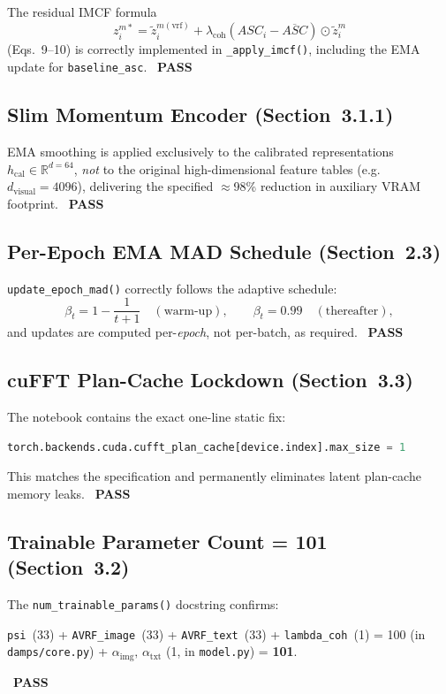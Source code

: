 \documentclass[12pt,a4paper]{article}
\newcommand{\PASS}{\textcolor{passgreen}{\ding{51}~\textbf{PASS}}}
\begin{document}
The residual IMCF formula
\[
  z_i^{m*} = \tilde{z}_i^{m(\mathrm{vrf})}
             + \lambda_{\mathrm{coh}}\!\left(ASC_i - \overline{ASC}\right)
               \odot \tilde{z}_i^m
\]
(Eqs.~9--10) is correctly implemented in \texttt{\_apply\_imcf()}, including
the EMA update for \texttt{baseline\_asc}.  \PASS

\subsection{Slim Momentum Encoder (Section~3.1.1)}

EMA smoothing is applied exclusively to the calibrated representations
$h_{\mathrm{cal}} \in \mathbb{R}^{d=64}$, \emph{not} to the original
high-dimensional feature tables (e.g.\ $d_{\mathrm{visual}}=4096$), delivering
the specified $\approx$98\% reduction in auxiliary VRAM footprint.  \PASS

\subsection{Per-Epoch EMA MAD Schedule (Section~2.3)}

\texttt{update\_epoch\_mad()} correctly follows the adaptive schedule:
\[
  \beta_t = 1 - \frac{1}{t+1} \quad (\text{warm-up}),
  \qquad
  \beta_t = 0.99 \quad (\text{thereafter}),
\]
and updates are computed per-\emph{epoch}, not per-batch, as required.  \PASS

\subsection{cuFFT Plan-Cache Lockdown (Section~3.3)}

The notebook contains the exact one-line static fix:
\begin{lstlisting}[language=Python]
torch.backends.cuda.cufft_plan_cache[device.index].max_size = 1
\end{lstlisting}
This matches the specification and permanently eliminates latent plan-cache
memory leaks.  \PASS

\subsection{Trainable Parameter Count = 101 (Section~3.2)}

The \texttt{num\_trainable\_params()} docstring confirms:
\begin{center}
  \texttt{psi}~(33) + \texttt{AVRF\_image}~(33) + \texttt{AVRF\_text}~(33)
  + \texttt{lambda\_coh}~(1) = 100 (in \texttt{damps/core.py})
  + $\alpha_{\mathrm{img}},\,\alpha_{\mathrm{txt}}$ (1, in \texttt{model.py}) = \textbf{101}.
\end{center}
\PASS
\end{document}
